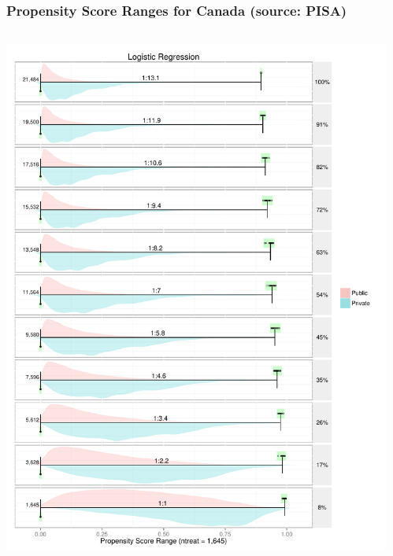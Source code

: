 \documentclass[10pt,handout,mathserif]{beamer}
\begin{document}
\begin{frame}[c]
	\frametitle{Propensity Score Ranges for Canada (source: PISA)}
	\begin{columns}
    \begin{column}{0.5\textwidth}
    	\begin{center}
    	\includegraphics[height=\textheight,keepaspectratio]{../Figures/PSRanges-lr-PISA}
    	\end{center}
    \end{column}
    \begin{column}{0.5\textwidth}
    	\begin{center}

\end{center}
\end{column}
\end{columns}
\end{frame}
\end{document}
